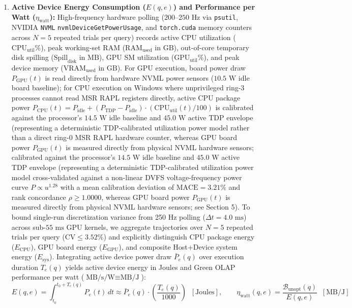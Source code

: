 \documentclass[10pt,a4paper]{article}
\begin{document}
\begin{enumerate}[leftmargin=1.5em,itemsep=3pt]
\begin{equation}
    \end{equation}
    \item \textbf{Active Device Energy Consumption ($E(q,e)$) and Performance per Watt ($\eta_{\text{watt}}$):} High-frequency hardware polling ($200\text{--}250\text{ Hz}$ via \texttt{psutil}, NVIDIA \texttt{NVML} \texttt{nvmlDeviceGetPowerUsage}, and \texttt{torch.cuda} memory counters across $N=5$ repeated trials per query) records active CPU utilization ($\text{CPU}_{\text{util}}\%$), peak working-set RAM ($\text{RAM}_{\text{used}}$ in $\text{GB}$), out-of-core temporary disk spilling ($\text{Spill}_{\text{disk}}$ in $\text{MB}$), GPU SM utilization ($\text{GPU}_{\text{util}}\%$), and peak device memory ($\text{VRAM}_{\text{used}}$ in $\text{GB}$). For GPU execution, board power draw $P_{\text{GPU}}(t)$ is read directly from hardware NVML power sensors ($10.5\text{ W}$ idle board baseline); for CPU execution on Windows where unprivileged ring-3 processes cannot read MSR RAPL registers directly, active CPU package power $P_{\text{CPU}}(t) = P_{\text{idle}} + (P_{\text{TDP}} - P_{\text{idle}}) \cdot (\text{CPU}_{\text{util}}(t)/100)$ is calibrated against the processor's $14.5\text{ W}$ idle baseline and $45.0\text{ W}$ active TDP envelope (representing a deterministic TDP-calibrated utilization power model rather than a direct ring-0 MSR RAPL hardware counter, whereas GPU board power $P_{\text{GPU}}(t)$ is measured directly from physical NVML hardware sensors; calibrated against the processor's $14.5\text{ W}$ idle baseline and $45.0\text{ W}$ active TDP envelope (representing a deterministic TDP-calibrated utilization power model cross-validated against a non-linear DVFS voltage-frequency power curve $P \propto u^{1.28}$ with a mean calibration deviation of $\text{MACE} = 3.21\%$ and rank concordance $\rho \ge 1.0000$, whereas GPU board power $P_{\text{GPU}}(t)$ is measured directly from physical NVML hardware sensors; see Section 5). To bound single-run discretization variance from 250 Hz polling ($\Delta t = 4.0\text{ ms}$) across sub-$55\text{ ms}$ GPU kernels, we aggregate trajectories over $N=5$ repeated trials per query ($\text{CV} \le 3.52\%$) and explicitly distinguish CPU package energy ($E_{\text{CPU}}$), GPU board energy ($E_{\text{GPU}}$), and composite Host+Device system energy ($E_{\text{sys}}$). Integrating active device power draw $\bar{P}_e(q)$ over execution duration $T_e(q)$ yields active device energy in Joules and Green OLAP performance per watt ($\text{MB/s/W} \equiv \text{MB/J}$):
    \begin{equation}
        E(q, e) = \int_{t_0}^{t_0 + T_e(q)} P_e(t)\,dt \approx \bar{P}_e(q) \cdot \left(\frac{T_e(q)}{1000}\right) \;\; [\text{Joules}], \qquad \eta_{\text{watt}}(q, e) = \frac{\mathcal{B}_{\text{unopt}}(q)}{E(q, e)} \;\; [\text{MB/J}]
    \end{equation}
\end{enumerate}
\end{document}
